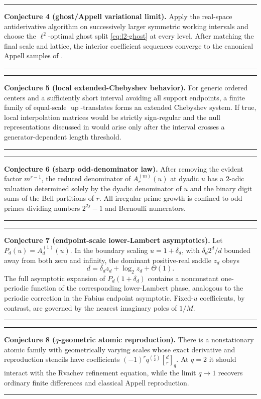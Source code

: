 \documentclass[11pt,oneside]{article}
\theoremstyle{definition}
\theoremstyle{remark}
\newcommand{\Up}{\operatorname{up}}
\newcommand{\qbinom}[3]{\genfrac{[}{]}{0pt}{}{#1}{#2}_{#3}}
\newenvironment{conjecturebox}{%
  \par\smallskip\noindent\begin{center}\begin{minipage}{0.94\textwidth}%
  \hrule\vspace{0.6em}\small
}{%
  \vspace{0.6em}\hrule\end{minipage}\end{center}\smallskip
}
\begin{document}
\begin{conjecturebox}
\textbf{Conjecture 4 (ghost/Appell variational limit).}
Apply the real-space antiderivative algorithm on successively larger symmetric
working intervals and choose the \(\ell^2\)-optimal ghost split
\eqref{eq:l2-ghost} at every level.  After matching the final scale and lattice,
the interior coefficient sequences converge to the canonical Appell samples
of .
\end{conjecturebox}

\begin{conjecturebox}
\textbf{Conjecture 5 (local extended-Chebyshev behavior).}
For generic ordered centers and a sufficiently short interval avoiding all
support endpoints, a finite family of equal-scale \(\Up\)-translates forms an
extended Chebyshev system.  If true, local interpolation matrices would be
strictly sign-regular and the null representations discussed in
 would arise only after the interval crosses a
generator-dependent length threshold.
\end{conjecturebox}

\begin{conjecturebox}
\textbf{Conjecture 6 (sharp odd-denominator law).}
After removing the evident factor \(m^{r-1}\), the reduced denominator of
\(A_r^{(m)}(u)\) at dyadic \(u\) has a \(2\)-adic valuation determined solely
by the dyadic denominator of \(u\) and the binary digit sums of the Bell
partitions of \(r\).  All irregular prime growth is confined to odd primes
dividing numbers \(2^{2j}-1\) and Bernoulli numerators.
\end{conjecturebox}

\begin{conjecturebox}
\textbf{Conjecture 7 (endpoint-scale lower-Lambert asymptotics).}
Let \(P_d(u)=A_d^{(1)}(u)\).  In the boundary scaling
\(u=1+\delta_d\), with \(\delta_d2^d/d\) bounded away from both zero and
infinity, the dominant positive-real saddle \(z_d\) obeys
\[
 d=\delta_d z_d+\log_2 z_d+\Theta(1).
\]
The full asymptotic expansion of \(P_d(1+\delta_d)\) contains a nonconstant
one-periodic function of the corresponding lower-Lambert phase, analogous to
the periodic correction in the Fabius endpoint asymptotic.  Fixed-\(u\)
coefficients, by contrast, are governed by the nearest imaginary poles of
\(1/M\).
\end{conjecturebox}

\begin{conjecturebox}
\textbf{Conjecture 8 (\(q\)-geometric atomic reproduction).}
There is a nonstationary atomic family with geometrically varying scales whose
exact derivative and reproduction stencils have coefficients
\((-1)^rq^{\binom r2}\qbinom{d}{r}{q}\).  At \(q=2\) it should interact with
the Rvachev refinement equation, while the limit \(q\to1\) recovers ordinary
finite differences and classical Appell reproduction.
\end{conjecturebox}
\end{document}
